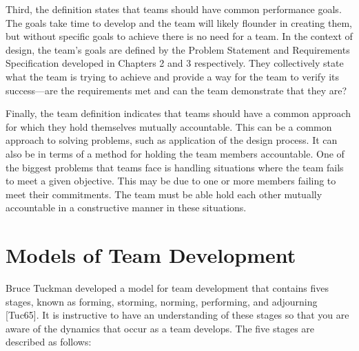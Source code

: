 Third, the definition states that teams should have common performance
goals. The goals take time to develop and the team will likely flounder
in creating them, but without specific goals to achieve there is no need
for a team. In the context of design, the team's goals are defined by
the Problem Statement and Requirements Specification developed in
Chapters 2 and 3 respectively. They collectively state what the team is
trying to achieve and provide a way for the team to verify its
success---are the requirements met and can the team demonstrate that
they are?

Finally, the team definition indicates that teams should have a common
approach for which they hold themselves mutually accountable. This can
be a common approach to solving problems, such as application of the
design process. It can also be in terms of a method for holding the team
members accountable. One of the biggest problems that teams face is
handling situations where the team fails to meet a given objective. This
may be due to one or more members failing to meet their commitments. The
team must be able hold each other mutually accountable in a constructive
manner in these situations.

\section{Models of Team Development}
\label{section:models-of-team-development}

Bruce Tuckman developed a model for team development that contains fives
stages, known as forming, storming, norming, performing, and adjourning
{[}Tuc65{]}. It is instructive to have an understanding of these stages
so that you are aware of the dynamics that occur as a team develops. The
five stages are described as follows:

